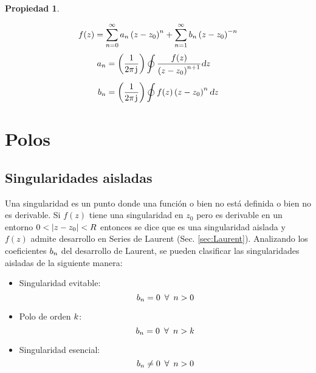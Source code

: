 \documentclass[a5paper,12pt,twoside]{book}
\newtheorem{prop}{{Propiedad}}[chapter]
\begin{document}
\begin{mdframed}[style=PropertyFrame]
    \begin{prop}
    \end{prop}
    \begin{equation*}
        f(z) = \sum_{n=0}^\infty a_n \left(z-z_0\right)^n + \sum_{n=1}^\infty b_n \left(z-z_0\right)^{-n}
    \end{equation*}
    \begin{align*}
        a_n &= \left( \frac{1}{2\pi \mkern2mu\mathrm{j}\mkern1mu} \right) \displaystyle\oint \frac{f(z)}{\left(z-z_0\right)^{n+1}} \textsl{d} z
        \\[1ex]
        b_n &= \left( \frac{1}{2\pi \mkern2mu\mathrm{j}\mkern1mu} \right) \displaystyle\oint f(z) \left(z-z_0\right)^n \textsl{d} z
    \end{align*}
\end{mdframed}


\chapter{Polos}


\section{Singularidades aisladas}

Una singularidad es un punto donde una función o bien no está definida o bien no es derivable.
Si $f(z)$ tiene una singularidad en $z_0$ pero es derivable en un entorno $0<{\left| {z-z_0} \right|}<R$ entonces se dice que es una singularidad aislada y $f(z)$ admite desarrollo en Series de Laurent (Sec. \ref{sec:Laurent}).
Analizando los coeficientes $b_n$ del desarrollo de Laurent, se pueden clasificar las singularidades aisladas de la siguiente manera:

\begin{itemize}
    \item Singularidad evitable:
    \begin{equation*}
        b_n = 0 \enspace \forall \enspace n>0
    \end{equation*}
    \item Polo de orden $k$:
    \begin{equation*}
        b_n = 0 \enspace \forall \enspace n>k
    \end{equation*}
    \item Singularidad esencial:
    \begin{equation*}
        b_n \neq 0 \enspace \forall \enspace n>0
    \end{equation*}
\end{itemize}
\end{document}
